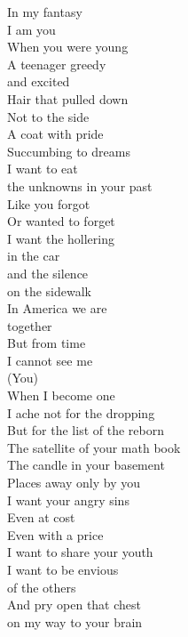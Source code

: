 In my fantasy\\
I am you\\
When you were young\\
A teenager greedy\\
and excited\\
Hair that pulled down\\
Not to the side\\
A coat with pride\\
Succumbing to dreams\\

I want to eat\\
the unknowns in your past\\
Like you forgot\\
Or wanted to forget\\
I want the hollering\\
in the car\\
and the silence\\
on the sidewalk\\
In America we are\\
together\\
But from time\\
I cannot see me\\
(You)\\

When I become one\\
I ache not for the dropping\\
But for the list of the reborn\\
The satellite of your math book\\
The candle in your basement\\
Places away only by you\\
I want your angry sins\\
Even at cost\\
Even with a price\\
I want to share your youth\\
I want to be envious\\
of the others\\
And pry open that chest\\
on my way to your brain\\

